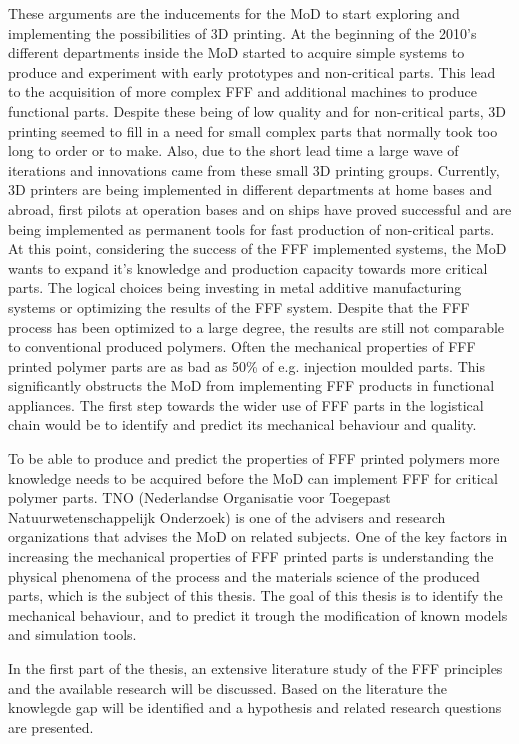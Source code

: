 These arguments are the inducements for the MoD to start exploring and implementing the possibilities of 3D printing. At the beginning of the 2010's different departments inside the MoD started to acquire simple systems to produce and experiment with early prototypes and non-critical parts. This lead to the acquisition of more complex FFF and additional machines to produce functional parts. Despite these being of low quality and for non-critical parts, 3D printing seemed to fill in a need for small complex parts that normally took too long to order or to make. Also, due to the short lead time a large wave of iterations and innovations came from these small 3D printing groups. Currently, 3D printers are being implemented in different departments at home bases and abroad, first pilots at operation bases and on ships have proved successful and are being implemented as permanent tools for fast production of non-critical parts. At this point, considering the success of the FFF implemented systems, the MoD wants to expand it's knowledge and production capacity towards more critical parts. The logical choices being investing in metal additive manufacturing systems or optimizing the results of the FFF system. Despite that the FFF process has been optimized to a large degree, the results are still not comparable to conventional produced polymers. Often the mechanical properties of FFF printed polymer parts are as bad as 50\% of e.g. injection moulded parts. This significantly obstructs the MoD from implementing FFF products in functional appliances. The first step towards the wider use of FFF parts in the logistical chain would be to identify and predict its mechanical behaviour and quality.

To be able to produce and predict the properties of FFF printed polymers more knowledge needs to be acquired before the MoD can implement FFF for critical polymer parts. TNO (Nederlandse Organisatie voor Toegepast Natuurwetenschappelijk Onderzoek) is one of the advisers and research organizations that advises the MoD on related subjects. One of the key factors in increasing the mechanical properties of FFF printed parts is understanding the physical phenomena of the process and the materials science of the produced parts, which is the subject of this thesis. The goal of this thesis is to identify the mechanical behaviour, and to predict it trough the modification of known models and simulation tools.

In the first part of the thesis, an extensive literature study of the FFF principles and the available research will be discussed. Based on the literature the knowlegde gap will be identified and a hypothesis and related research questions are presented.

